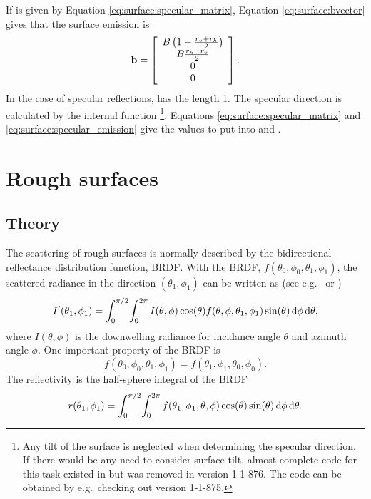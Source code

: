 If  is given by Equation \ref{eq:surface:specular_matrix},
Equation \ref{eq:surface:bvector} gives that the surface emission  is
\begin{equation}
  \label{eq:surface:specular_emission}
   \mathbf{b} = \left[\begin{array}{c}
     B\left(1-\frac{r_v+r_h}{2}\right) \\
     B\frac{r_h-r_v}{2} \\
     0\\0
   \end{array}\right].
\end{equation}
In the case of specular reflections,  has the length 1.
The specular direction is calculated by the internal function
\footnote{Any tilt of the surface is
  neglected when determining the specular direction. If there would be any need
  to consider surface tilt, almost complete code for this task existed in
   but was removed in version 1-1-876. The
  code can be obtained by e.g.\ checking out version 1-1-875.}. Equations
\ref{eq:surface:specular_matrix} and \ref{eq:surface:specular_emission} give
the values to put into  and
.



\section{Rough surfaces}
 \label{sec:surface:rough}


\subsection{Theory}
\label{sec:surface:rough:theory}
The scattering of rough surfaces is normally described by the bidirectional
reflectance distribution function, BRDF. With the BRDF,
$f(\theta_0,\phi_0,\theta_1,\phi_1)$, the scattered radiance in the
direction $(\theta_1,\phi_1)$ can be written as (see e.g.\ 
\citet{rees:01} or \citet{petty:06})
\begin{equation}
  \label{eq:surface:brdf1}
  I'(\theta_1,\phi_1) = \int_0^{\pi/2} \! \int_0^{2\pi} I(\theta,\phi) 
  \cos(\theta) f(\theta,\phi,\theta_1,\phi_1)
  \sin(\theta) \, \mathrm{d}\phi \, \mathrm{d}\theta,
\end{equation}
where $I(\theta,\phi)$ is the downwelling radiance for incidance angle $\theta$
and azimuth angle $\phi$. One important property of the BRDF is
\begin{equation}
  f(\theta_0,\phi_0,\theta_1,\phi_1) = f(\theta_1,\phi_1,\theta_0,\phi_0).
\end{equation}
The reflectivity is the half-sphere integral of the BRDF
\begin{equation}
  \label{eq:surface:brdf:r}
  r(\theta_1,\phi_1) = \int_0^{\pi/2} \! \int_0^{2\pi} 
  f(\theta_1,\phi_1,\theta,\phi) \cos(\theta)
  \sin(\theta) \, \mathrm{d}\phi \, \mathrm{d}\theta.
\end{equation}

